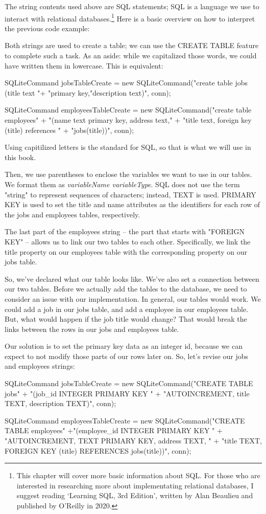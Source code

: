 \documentclass[oneside, openany] {book}
\begin{document}
The string contents used above are SQL statements; SQL is a language we use to interact with relational databases.\footnote{This chapter will cover more basic information about SQL. For those who are interested in researching more about implementating relational databases, I suggest reading `Learning SQL, 3rd Edition', written by Alan Beaulieu and published by O'Reilly in 2020.}
Here is a basic overview on how to interpret the previous code example:

Both strings are used to create a table; we can use the CREATE TABLE feature to complete such a task. As an aside: while we capitalized those words, we could have written them in lowercase. This is equivalent:

\begin{CSharp}
SQLiteCommand jobsTableCreate = new SQLiteCommand("create table jobs (title text "+
"primary key,"description text)", conn);

SQLiteCommand employeesTableCreate = new SQLiteCommand("create table employees" + 
"(name text primary key, address text," +
"title text, foreign key (title) references " + "jobs(title))", conn);
\end{CSharp}
Using capitilized letters is the standard for SQL, so that is what we will use in this book.

Then, we use parentheses to enclose the variables we want to use in our tables. We format them as \emph{variableName variableType}. SQL does not use the term "string" to represent sequences of characters; instead, TEXT is used. PRIMARY KEY is used to set the title and name attributes as the identifiers for each row of the jobs and employees tables, respectively.

The last part of the employees string -- the part that starts with "FOREIGN KEY" -- allows us to link our two tables to each other. Specifically, we link the title property on our employees table with the corresponding property on our jobs table.

So, we've declared what our table looks like. We've also set a connection between our two tables. Before we actually add the tables to the database, we need to consider an issue with our implementation. In general, our tables would work. We could add a job in our jobs table, and add a employee in our employees table. But, what would happen if the job title would change? That would break the links between the rows in our jobs and employees table.

Our solution is to set the primary key data as an integer id, because we can expect to not modify those parts of our rows later on. So, let's revise our jobs and employees strings:
\begin{CSharp}

SQLiteCommand jobsTableCreate = new SQLiteCommand("CREATE TABLE jobs" + 
"(job_id INTEGER PRIMARY KEY " + 
"AUTOINCREMENT, title TEXT, description TEXT)", conn);

SQLiteCommand employeesTableCreate = new SQLiteCommand("CREATE TABLE employees" 
+"(employee_id INTEGER PRIMARY KEY " +
"AUTOINCREMENT, TEXT PRIMARY KEY, address TEXT, "
+ "title TEXT, FOREIGN KEY (title) REFERENCES jobs(title))", conn);
\end{CSharp}
\end{document}
